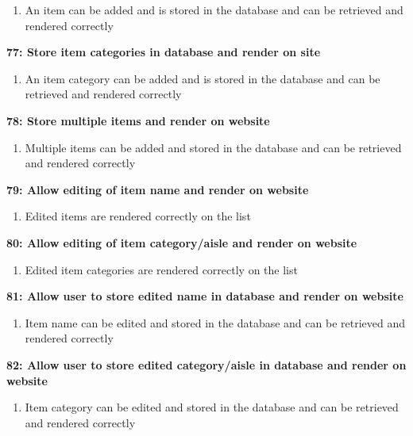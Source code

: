 \documentclass[10pt,onecolumn]{witseiepaper}
\begin{document}
\begin{enumerate}
	\item An item can be added and is stored in the database and can be retrieved and rendered correctly
\end{enumerate}

\textbf{77: Store item categories in database and render on site}

\begin{enumerate}
	\item An item category can be added and is stored in the database and can be retrieved and rendered correctly
\end{enumerate}

\textbf{78: Store multiple items and render on website}

\begin{enumerate}
	\item Multiple items can be added and stored in the database and can be retrieved and rendered correctly
\end{enumerate}

\textbf{79: Allow editing of item name and render on website}

\begin{enumerate}
	\item Edited items are rendered correctly on the list
\end{enumerate}

\textbf{80: Allow editing of item category/aisle and render on website}

\begin{enumerate}
	\item Edited item categories are rendered correctly on the list
\end{enumerate}

\textbf{81: Allow user to store edited name in database and render on website}

\begin{enumerate}
	\item Item name can be edited and stored in the database and can be retrieved and rendered correctly
\end{enumerate}

\textbf{82: Allow user to store edited category/aisle in database and render on website}

\begin{enumerate}
	\item Item category can be edited and stored in the database and can be retrieved and rendered correctly
\end{enumerate}
\end{document}
